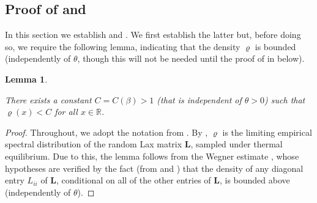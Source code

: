 \documentclass{amsart}
\numberwithin{equation}{section}
\newtheorem{lem}[thm]{Lemma}
\theoremstyle{remark}
\theoremstyle{definition}
\begin{document}
	
	\subsection{Proof of  and }
	
	\label{ProofIntegral} 
	
	
	In this section we establish  and . We first establish the latter but, before doing so, we require the following lemma, indicating that the density $\varrho$ is bounded (independently of $\theta$, though this will not be needed until the proof of  in  below). 
	
	\begin{lem} 
		
		\label{1thetarho} 
		
		There exists a constant $C = C(\beta) > 1$ (that is independent of $\theta>0$) such that $\varrho (x) < C$ for all $x \in \mathbb{R}$.
		
	\end{lem} 
	
	\begin{proof} 
		
		Throughout, we adopt the notation from . By , $\varrho$ is the limiting empirical spectral distribution of the random Lax matrix $\bm{L}$, sampled under thermal equilibrium. Due to this, the lemma follows from the Wegner estimate \cite[Theorem 4.1]{R}, whose hypotheses are verified by the fact (from  and ) that the density of any diagonal entry $L_{ii}$ of $\bm{L}$, conditional on all of the other entries of $\bm{L}$, is bounded above (independently of $\theta$).
	\end{proof}
	
	
	
\end{document}
